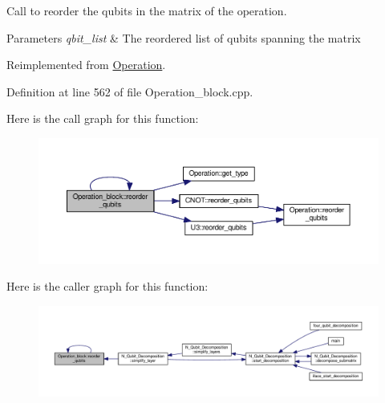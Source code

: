 Call to reorder the qubits in the matrix of the operation. 


\begin{DoxyParams}{Parameters}
{\em qbit\+\_\+list} & The reordered list of qubits spanning the matrix \\
\hline
\end{DoxyParams}


Reimplemented from \hyperlink{class_operation_a73a8408873507d5630f57c200915a0c0}{Operation}.



Definition at line 562 of file Operation\+\_\+block.\+cpp.



Here is the call graph for this function\+:
\nopagebreak
\begin{figure}[H]
\begin{center}
\leavevmode
\includegraphics[width=350pt]{class_operation__block_af2a71d29cdbce498e85f11b9ed81e0c9_cgraph}
\end{center}
\end{figure}




Here is the caller graph for this function\+:
\nopagebreak
\begin{figure}[H]
\begin{center}
\leavevmode
\includegraphics[width=350pt]{class_operation__block_af2a71d29cdbce498e85f11b9ed81e0c9_icgraph}
\end{center}
\end{figure}



